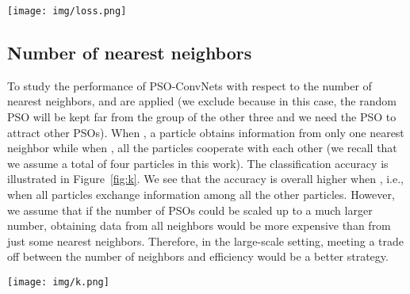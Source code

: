 \documentclass{ieeeaccess}
\begin{document}
\begin{figure*}[htb!]
\begin{center}
\texttt{[image: img/loss.png]}
\caption{Effects of  to distances between PSOs for  and .}
\label{fig:loss}
\end{center}
\end{figure*}
\subsection{Number of nearest neighbors}
To study the performance of PSO-ConvNets with respect to the number  of nearest neighbors,   and   are applied (we exclude  because in this case, the random PSO will be kept far from the group of the other three and we need the PSO to attract other PSOs). When , a particle obtains information from only one nearest neighbor while when , all the particles cooperate with each other (we recall that we assume a total of four particles in this work). The classification accuracy is illustrated in Figure~\ref{fig:k}. We see that the accuracy is overall higher when , i.e., when all particles exchange information among all the other particles. However, we assume that if the number of PSOs could be scaled up to a much larger number, obtaining data from all neighbors would be more expensive than from just some nearest neighbors. Therefore, in the large-scale setting, meeting a trade off between the number of neighbors and efficiency would be a better strategy.
\begin{figure*}[htb!]
\begin{center}
\texttt{[image: img/k.png]}
\caption{Comparison accuracy performance when number of nearest neighbors  and .}
\label{fig:k}
\end{center}
\end{figure*}
\end{document}
